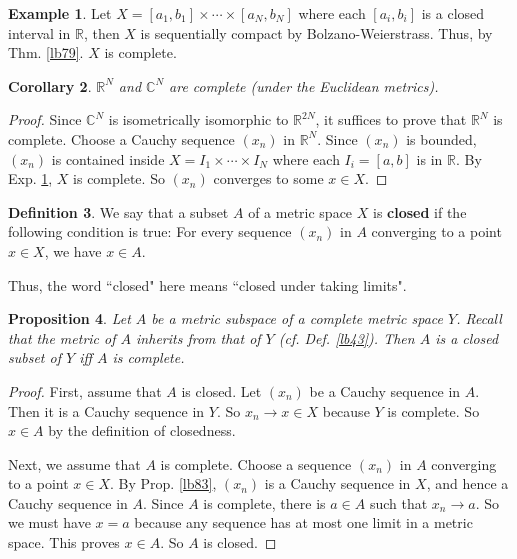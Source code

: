 \documentclass[12pt,b5paper,notitlepage]{article}
\theoremstyle{definition}
\newtheorem{df}{Definition}[section]
\newtheorem{eg}[df]{Example}
\theoremstyle{plain}
\newtheorem{pp}[df]{Proposition}
\newtheorem{co}[df]{Corollary}
\newcommand{\Cbb}{\mathbb C}
\newcommand{\Rbb}{\mathbb R}
\numberwithin{equation}{section}
\begin{document}
\begin{eg}\label{lb84}
Let  $X=[a_1,b_1]\times\cdots\times [a_N,b_N]$  where each $[a_i,b_i]$ is a closed interval in $\Rbb$, then $X$ is  sequentially compact by Bolzano-Weierstrass. Thus, by Thm. \ref{lb79}. $X$ is complete.
\end{eg}


\begin{co}\label{lb80}
$\Rbb^N$ and $\Cbb^N$ are complete (under the Euclidean metrics).
\end{co}

\begin{proof}
Since $\Cbb^N$ is isometrically isomorphic to $\Rbb^{2N}$, it suffices to prove that $\Rbb^N$ is complete. Choose a Cauchy sequence $(x_n)$ in $\Rbb^N$. Since $(x_n)$ is bounded, $(x_n)$ is contained inside $X=I_1\times\cdots\times I_N$ where each $I_i=[a,b]$ is in $\Rbb$. By Exp. \ref{lb84}, $X$ is complete. So $(x_n)$ converges to some $x\in X$.
\end{proof}





\begin{df}
We say that a subset $A$ of a metric space $X$ is \textbf{closed}  if the following condition is true: For every sequence $(x_n)$ in $A$ converging to a point $x\in X$, we have $x\in A$.
\end{df}


Thus, the word ``closed" here means ``closed under taking limits".


\begin{pp}\label{lb86}
Let $A$ be a metric subspace of a complete metric space $Y$. Recall  that the metric of $A$ inherits from that of $Y$ (cf. Def. \ref{lb43}). Then $A$ is a closed subset of $Y$ iff $A$ is complete.
\end{pp}


\begin{proof}
First, assume that $A$ is closed. Let $(x_n)$ be a Cauchy sequence in $A$. Then it is a Cauchy sequence in $Y$. So $x_n\rightarrow x\in X$ because $Y$ is complete. So $x\in A$ by the definition of closedness.

Next, we assume that $A$ is complete. Choose a sequence $(x_n)$ in $A$ converging to a point $x\in X$. By Prop. \ref{lb83}, $(x_n)$ is a Cauchy sequence in $X$, and hence a Cauchy sequence in $A$. Since $A$ is complete, there is $a\in A$ such that $x_n\rightarrow a$. So we must have $x=a$ because any sequence has at most one limit in a metric space. This proves $x\in A$. So $A$ is closed.
\end{proof}
\end{document}
